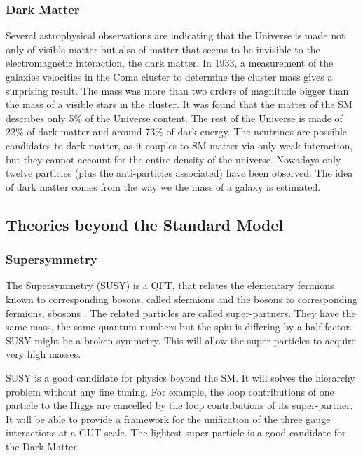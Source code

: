     \subsubsection{Dark Matter}
    
    Several astrophysical observations are indicating that the Universe is made not only of visible matter but also of matter that seems to be invisible to the electromagnetic interaction, the dark matter.
    In 1933, a measurement of the galaxies velocities in the Coma cluster to determine the cluster mass gives a surprising result.
    The mass was more than two orders of magnitude bigger than the mass of a visible stars in the cluster.
    It was found that the matter of the \acrshort{SM} describes only 5\% of the Universe content. 
    The rest of the Universe is made of 22\% of dark matter and around 73\% of dark energy.
    The neutrinos are possible candidates to dark matter, as it couples to \acrshort{SM} matter via only weak interaction, but they cannot account for the entire density of the universe.
    Nowadays only twelve particles (plus the anti-particles associated) have been observed. 
    The idea of dark matter comes from the way we the mass of a galaxy is estimated.

    \subsection{Theories beyond the Standard Model}

      \subsubsection{Supersymmetry}
    
      The Supersymmetry (SUSY) is a QFT, that relates the elementary fermions known to corresponding bosons, called sfermions and the bosons to corresponding fermions, sbosons \cite{Signer2009}.
      The related particles are called super-partners.
      They have the same mass, the same quantum numbers but the spin is differing by a half factor.
      SUSY might be a broken symmetry. 
      This will allow the super-particles to acquire very high masses.

      SUSY is a good candidate for physics beyond the \acrshort{SM}. 
      It will solves the hierarchy problem without any fine tuning.
      For example, the loop contributions of one particle to the Higgs are cancelled by the loop contributions of its super-partner.
      It will be able to provide a framework for the unification of the three gauge interactions at a GUT scale.
      The lightest super-particle is a good candidate for the Dark Matter.

